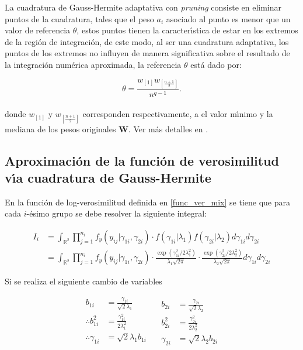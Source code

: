 La cuadratura de Gauss-Hermite adaptativa con \textit{pruning} consiste en eliminar puntos de la cuadratura, tales que el peso $a_i$ asociado al punto es menor que un valor de referencia $\theta$, estos puntos tienen la caracter\'{\i}stica de estar en los extremos de la regi\'{o}n de integraci\'{o}n, de este modo, al ser una cuadratura adaptativa, los puntos de los extremos no influyen de manera significativa sobre el resultado de la integraci\'{o}n num\'{e}rica aproximada, la referencia $\theta$ est\'{a} dado por:

\[
\theta=\frac{w_{[1]}w_{[\frac{n+1}{2}]}}{n^{q-1}}.
\]
\\
donde $w_{[1]}$ y $w_{[\frac{n+1}{2}]}$ corresponden respectivamente, a el valor m\'{\i}nimo y la mediana de los pesos originales \textbf{W}. Ver m\'{a}s detalles en \cite{Hernandez1}.


\subsection{Aproximaci\'{o}n de la funci\'{o}n de verosimilitud v\'{\i}a cuadratura de Gauss-Hermite}

En la funci\'{o}n de log-verosimilitud definida en \eqref{func_ver_mix} se tiene que para cada $i$-\'{e}simo grupo se debe resolver la siguiente integral:

\begin{align*}
I_i &= \int_{\mathbb{R}^2}{\prod_{j=1}^{n_i}f_y(y_{ij}|\gamma_{1i},\gamma_{2i})\cdot f(\gamma_{1i}|\lambda_1) f(\gamma_{2i}|\lambda_2) d\gamma_{1i}d\gamma_{2i}}\\
&=\int_{\mathbb{R}^2}{\prod_{j=1}^{n_i}f_y(y_{ij}|\gamma_{1i},\gamma_{2i})\cdot \frac{\exp({\gamma_{1i}^2}/{2\lambda_1^2})}{\lambda_1\sqrt{2\pi}} \cdot \frac{\exp({\gamma_{2i}^2}/{2\lambda_2^2})}{\lambda_2\sqrt{2\pi}} d\gamma_{1i}d\gamma_{2i}}
\end{align*}

Si se realiza el siguiente cambio de variables

\begin{equation*}
\begin{aligned}
b_{1i}&=\frac{\gamma_{1i}}{\sqrt{2}\lambda_1}\\
\therefore b_{1i}^2&=\frac{\gamma_{1i}^2}{2\lambda_1^2}\\
\therefore \gamma_{1i}&=\sqrt{2}\lambda_1b_{1i}\\
\end{aligned}
\quad
\begin{aligned}
b_{2i}&=\frac{\gamma_{2i}}{\sqrt{2}\lambda_2}\\
b_{2i}^2&=\frac{\gamma_{2i}^2}{2\lambda_2^2}\\
\gamma_{2i}&=\sqrt{2}\lambda_2 b_{2i}
\end{aligned}
\end{equation*}

